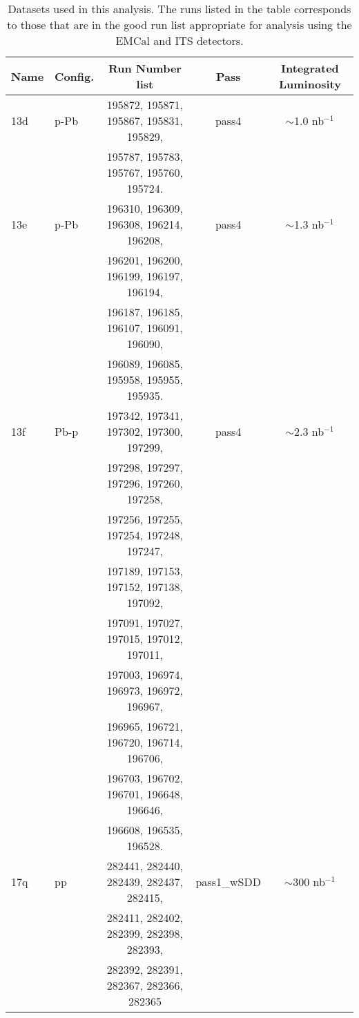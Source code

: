 \begin{table}[h]
   \centering
   \caption{Datasets used in this analysis. The runs listed in the table corresponds to those that are in the good run list appropriate for analysis using the EMCal and ITS detectors.}
   \label{tab:datasets}
   \begin{tabular*}{1.0\columnwidth}{@{\extracolsep{\fill}}llccc@{}}
      	\hline
        Name  & Config. &  Run Number list  & Pass &  Integrated Luminosity\\
        \hline
      	13d& p-Pb & 195872, 195871, 195867, 195831, 195829,  & pass4& $\sim$1.0 nb$^{-1}$\\
        &  & 195787, 195783, 195767, 195760, 195724. &   &\\
        \hline
        13e & p-Pb & 196310, 196309, 196308, 196214, 196208, & pass4 & $\sim$1.3 nb$^{-1}$\\
         &  &      196201, 196200, 196199, 196197, 196194, & & \\ 
         &  &     196187, 196185, 196107, 196091, 196090, & & \\
         &  &    196089, 196085, 195958, 195955, 195935.  & & \\
         \hline
         13f & Pb-p & 197342, 197341, 197302, 197300, 197299, & pass4 & $\sim$2.3 nb$^{-1}$\\
          &  &                 197298, 197297, 197296, 197260, 197258,&  &\\
          &  &                 197256, 197255, 197254, 197248, 197247,& & \\
          &  &                 197189, 197153, 197152, 197138, 197092,&  &\\
          &  &                 197091, 197027, 197015, 197012, 197011,& & \\
          &  &                 197003, 196974, 196973, 196972, 196967,&  & \\
          &  &                 196965, 196721, 196720, 196714, 196706, & & \\
          &  &                 196703, 196702, 196701, 196648, 196646,& & \\
          &  &                 196608, 196535, 196528. & &\\               \hline

  	17q & pp & 282441, 282440, 282439, 282437, 282415,  & pass1\_wSDD & $\sim$300 nb$^{-1}$\\
     &  & 282411, 282402, 282399, 282398, 282393,  & &\\ 
     & & 282392, 282391, 282367, 282366, 282365  & & \\
		\hline  
   \end{tabular*}
\end{table}

%
